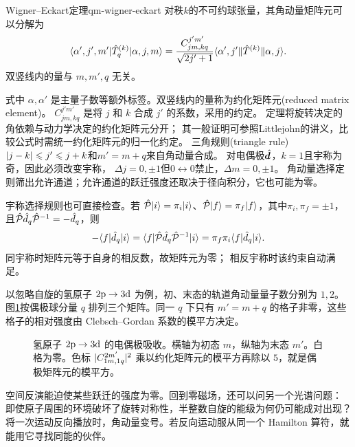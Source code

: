 \begin{theorem}{Wigner--Eckart定理}{qm-wigner-eckart}
    对秩$k$的不可约球张量，其角动量矩阵元可以分解为
    \begin{equation}
        \langle\alpha',j',m'\vert\hat{T}_q^{(k)}\vert\alpha,j,m\rangle
        = \frac{C^{j'm'}_{jm,kq}}{\sqrt{2j' + 1}}
        \langle\alpha',j'\|\hat{T}^{(k)}\|\alpha,j\rangle.
    \end{equation}
    双竖线内的量与 $m,m',q$ 无关。
\end{theorem}

式中 $\alpha,\alpha'$ 是主量子数等额外标签。双竖线内的量称为约化矩阵元(reduced matrix element)。
$C^{j'm'}_{jm,kq}$ 是将 $j$ 和 $k$ 合成 $j'$ 的系数，采用的约定。
定理将旋转决定的角依赖与动力学决定的约化矩阵元分开；
其一般证明可参照Littlejohn的讲义，比较公式时需统一约化矩阵元的归一化约定\cite{littlejohnwe}。
三角规则(triangle rule) $\lvert j - k\rvert \leqslant j' \leqslant j + k$和$m' = m + q$来自角动量合成。
对电偶极$\hat{\bm{d}}$，$k = 1$且宇称为奇，因此必须改变宇称，
$\Delta j = 0,\pm1$但$0 \leftrightarrow 0$禁止，$\Delta m = 0,\pm1$。
角动量选择定则筛出允许通道；允许通道的跃迁强度还取决于径向积分，它也可能为零。

宇称选择规则也可直接检查。若
$\hat{\mathcal P}\lvert i\rangle = \pi_i\lvert i\rangle$、$\hat{\mathcal P}\lvert f\rangle = \pi_f\lvert f\rangle$，其中$\pi_i,\pi_f = \pm1$，
且$\hat{\mathcal P} \hat{d}_q\hat{\mathcal P}^{-1} = -\hat{d}_q$，则
\[
    -\langle f\vert\hat{d}_q\vert i\rangle
    = \langle f\vert\hat{\mathcal P}\hat{d}_q\hat{\mathcal P}^{-1}\vert i\rangle
    = \pi_f\pi_i\langle f\vert\hat{d}_q\vert i\rangle.
\]
同宇称时矩阵元等于自身的相反数，故矩阵元为零；
相反宇称时该约束自动满足。

以忽略自旋的氢原子 $2\mathrm{p} \to 3\mathrm{d}$ 为例，初、末态的轨道角动量量子数分别为 $1,2$。图\ref{fig:qm-dipole-selection-matrices}按偶极球分量 $q$ 排列三个矩阵。同一 $q$ 下只有 $m' = m + q$ 的格子非零，这些格子的相对强度由 Clebsch--Gordan 系数的模平方决定。

\begin{figure}[htbp]
    \centering
    \caption{氢原子 $2\mathrm{p} \to 3\mathrm{d}$ 的电偶极吸收。横轴为初态 $m$，纵轴为末态 $m'$。白格为零。色标 $\lvert C^{2m'}_{1m,1q}\rvert^2$ 乘以约化矩阵元的模平方再除以 $5$，就是偶极矩阵元的模平方。}
    \label{fig:qm-dipole-selection-matrices}
\end{figure}

空间反演能迫使某些跃迁的强度为零。回到零磁场，还可以问另一个光谱问题：
即使原子周围的环境破坏了旋转对称性，半整数自旋的能级为何仍可能成对出现？
将一次运动反向播放时，角动量变号。若反向运动服从同一个 Hamilton 算符，就能用它寻找同能的伙伴。

